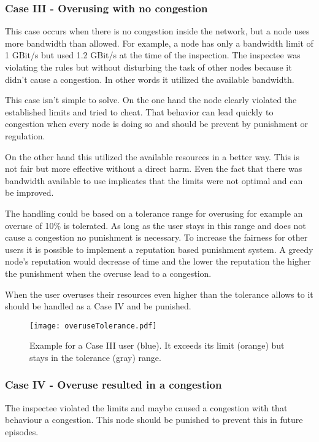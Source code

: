 \documentclass[thesis.tex]{subfiles}
\begin{document}
\subsubsection{Case III - Overusing with no congestion}
This case occurs when there is no congestion inside the network, but a node uses more bandwidth than allowed. For example, a node has only a bandwidth limit of 1 GBit/s but used 1.2 GBit/s at the time of the inspection. The inspectee was violating the rules but without disturbing the task of other nodes because it didn't cause a congestion. In other words it utilized the available bandwidth.

This case isn't simple to solve. On the one hand the node clearly violated the established limits and tried to cheat. That behavior can lead quickly to congestion when every node is doing so and should be prevent by punishment or regulation.

On the other hand this utilized the available resources in a better way. This is not fair but more effective without a direct harm. Even the fact that there was bandwidth available to use implicates that the limits were not optimal and can be improved.

The handling could be based on a tolerance range for overusing for example an overuse of 10\% is tolerated. As long as the user stays in this range and does not cause a congestion no punishment is necessary. To increase the fairness for other users it is possible to implement a reputation based punishment system. A greedy node's reputation would decrease of time and the lower the reputation the higher the punishment when the overuse lead to a congestion.

When the user overuses their resources even higher than the tolerance allows to it should be handled as a Case IV and be punished.

\begin{figure}
	\centering
	\texttt{[image: overuseTolerance.pdf]}
	\caption{Example for a Case III user (blue). It exceeds its limit (orange) but stays in the tolerance (gray) range.}
	\label{fig:main:caseIII}
\end{figure}

\subsubsection{Case IV - Overuse resulted in a congestion}
The inspectee violated the limits and maybe caused a congestion with that behaviour a congestion. This node should be punished to prevent this in future episodes.
\end{document}
